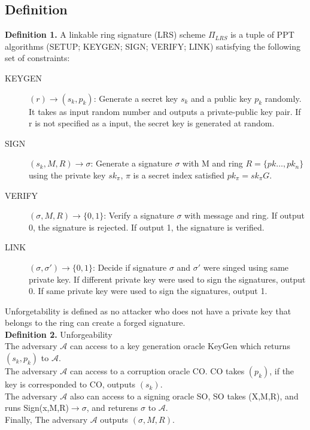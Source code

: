 \subsection{Definition} 
    \textbf{Definition 1.} A linkable ring signature (LRS) scheme $\Pi_{LRS}$  is a tuple of PPT algorithms (SETUP; KEYGEN; SIGN; VERIFY; LINK) satisfying the following set of constraints:
    \begin{description}
        \item[KEYGEN] $(r) \rightarrow (s_{k},p_{k}) $: Generate a secret key $s_{k}$ and a public key $p_{k}$ randomly. It takes as input random number and outputs a private-public key pair. If r is not specified as a input, the secret key is generated at random.
        \item[SIGN] $(s_{k},M,R) \rightarrow \sigma$: Generate a signature $\sigma $ with M and ring $R= \{ pk \ldots , pk_n \} $ using the private key $sk_{\pi}$, $\pi$ is a secret index satisfied $pk_\pi = sk_\pi G $.
        \item[VERIFY] $(\sigma, M, R) \rightarrow \{ 0,1 \}$: Verify a signature $\sigma$ with message and ring. If output 0, the signature is rejected. If output 1, the signature is verified.
        \item[LINK] $(\sigma, \sigma ') \rightarrow \{ 0,1 \}$: Decide if signature $\sigma $ and $\sigma '$ were singed using same private key. If different private key were used to sign the signatures, output 0. If same private key were used to sign the signatures, output 1.
    \end{description}
    Unforgetability is defined as no attacker who does not have a private key that belongs to the ring can create a forged signature.\\
    \textbf{Definition 2.} Unforgeability\\
    The adversary $\mathcal A $ can access to a key generation oracle KeyGen which returns $(s_{k},p_{k})$ to $\mathcal A $.\\
    The adversary $\mathcal A $ can access to a corruption oracle CO. CO takes $(p_{k})$, if the key is corresponded to CO, outputs $(s_{k})$.\\
    The adversary $\mathcal A $ also can access to a signing oracle SO, SO takes (X,M,R), and runs Sign(x,M,R)$\rightarrow \sigma$, and returens $\sigma$ to $\mathcal A$.\\
    Finally, The adversary $\mathcal A $ outputs $(\sigma , M,R)$.\\
